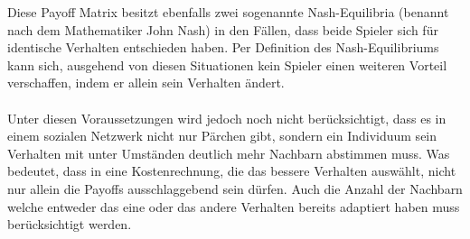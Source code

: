 \documentclass[12pt]{article}
\begin{document}
Diese Payoff Matrix besitzt ebenfalls zwei sogenannte Nash-Equilibria (benannt nach dem Mathematiker John Nash) in den Fällen, dass beide Spieler sich für identische Verhalten entschieden haben. Per Definition des Nash-Equilibriums kann sich, ausgehend von diesen Situationen kein Spieler einen weiteren Vorteil verschaffen, indem er allein sein Verhalten ändert.\\\\
Unter diesen Voraussetzungen wird jedoch noch nicht berücksichtigt, dass es in einem sozialen Netzwerk nicht nur Pärchen gibt, sondern ein Individuum sein Verhalten mit unter Umständen deutlich mehr Nachbarn abstimmen muss. Was bedeutet, dass in eine Kostenrechnung, die das bessere Verhalten auswählt, nicht nur allein die Payoffs ausschlaggebend sein dürfen. Auch die Anzahl der Nachbarn welche entweder das eine oder das andere Verhalten bereits adaptiert haben muss berücksichtigt werden.
\end{document}

